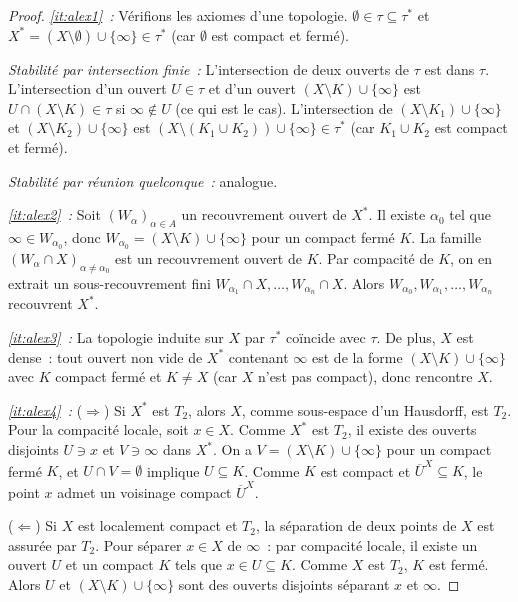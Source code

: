\documentclass[12pt,a4paper,openany]{book}
\theoremstyle{definition}
\theoremstyle{cours}
\theoremstyle{coursnormal}
\begin{document}
\begin{proof}
  \emph{\ref{it:alex1}~:} Vérifions les axiomes d'une topologie.
  $\emptyset\in\tau\subseteq\tau^*$ et $X^*=(X\setminus\emptyset)\cup\{\infty\}
  \in\tau^*$ (car $\emptyset$ est compact et fermé).

  \emph{Stabilité par intersection finie~:} L'intersection de deux ouverts de
  $\tau$ est dans $\tau$. L'intersection d'un ouvert $U\in\tau$ et d'un ouvert
  $(X\setminus K)\cup\{\infty\}$ est $U\cap(X\setminus K)\in\tau$ si
  $\infty\notin U$ (ce qui est le cas). L'intersection de $(X\setminus
  K_1)\cup\{\infty\}$ et $(X\setminus K_2)\cup\{\infty\}$ est
  $(X\setminus(K_1\cup K_2))\cup\{\infty\}\in\tau^*$ (car $K_1\cup K_2$ est
  compact et fermé).

  \emph{Stabilité par réunion quelconque~:} analogue.

  \medskip
  \emph{\ref{it:alex2}~:} Soit $(W_\alpha)_{\alpha\in A}$ un recouvrement
  ouvert de $X^*$. Il existe $\alpha_0$ tel que $\infty\in W_{\alpha_0}$, donc
  $W_{\alpha_0}=(X\setminus K)\cup\{\infty\}$ pour un compact fermé $K$. La
  famille $(W_\alpha\cap X)_{\alpha\neq\alpha_0}$ est un recouvrement ouvert de
  $K$. Par compacité de $K$, on en extrait un sous-recouvrement fini
  $W_{\alpha_1}\cap X,\ldots,W_{\alpha_n}\cap X$. Alors
  $W_{\alpha_0},W_{\alpha_1},\ldots,W_{\alpha_n}$ recouvrent $X^*$.

  \medskip
  \emph{\ref{it:alex3}~:} La topologie induite sur $X$ par $\tau^*$ coïncide
  avec $\tau$. De plus, $X$ est dense~: tout ouvert non vide de $X^*$ contenant
  $\infty$ est de la forme $(X\setminus K)\cup\{\infty\}$ avec $K$ compact
  fermé et $K\neq X$ (car $X$ n'est pas compact), donc rencontre $X$.

  \medskip
  \emph{\ref{it:alex4}~:} ($\Rightarrow$) Si $X^*$ est $T_2$, alors $X$,
  comme sous-espace d'un Hausdorff, est $T_2$. Pour la compacité locale, soit
  $x\in X$. Comme $X^*$ est $T_2$, il existe des ouverts disjoints $U\ni x$ et
  $V\ni\infty$ dans $X^*$. On a $V=(X\setminus K)\cup\{\infty\}$ pour un
  compact fermé $K$, et $U\cap V=\emptyset$ implique $U\subseteq K$. Comme
  $K$ est compact et $\overline{U}^X\subseteq K$, le point $x$ admet un
  voisinage compact $\overline{U}^X$.

  ($\Leftarrow$) Si $X$ est localement compact et $T_2$, la séparation de deux
  points de $X$ est assurée par $T_2$. Pour séparer $x\in X$ de $\infty$~: par
  compacité locale, il existe un ouvert $U$ et un compact $K$ tels que
  $x\in U\subseteq K$. Comme $X$ est $T_2$, $K$ est fermé. Alors $U$ et
  $(X\setminus K)\cup\{\infty\}$ sont des ouverts disjoints séparant $x$ et
  $\infty$.
\end{proof}
\end{document}
